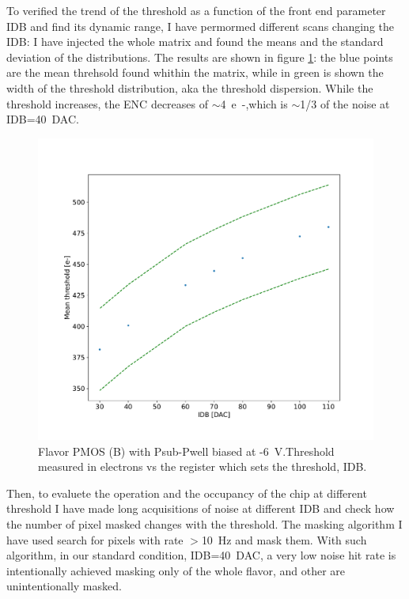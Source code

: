 
        To verified the trend of the threshold as a function of the front end parameter IDB and find its dynamic range, I have permormed different scans changing the IDB: I have injected the whole matrix and found the means and the standard deviation of the distributions. The results are shown in figure \ref{fig:threshold_vs_IDB}: the blue points are the mean threhsold found whithin the matrix, while in green is shown the width of the threshold distribution, aka the threshold dispersion. 
        While the threshold increases, the ENC decreases of $\sim$\SI{4}{e-},which is $\sim$1/3 of the noise at IDB=\SI{40}{DAC}. 
        \begin{figure}[h!]
            \centering
            \includegraphics[width=.70\linewidth]{figures/charaterization/thr_vs_IDB.pdf}
            \caption{Flavor PMOS (B) with Psub-Pwell biased at -\SI{6}{V}.Threshold measured in electrons vs the register which sets the threshold, IDB.  }
            \label{fig:threshold_vs_IDB}
        \end{figure}            

        Then, to evaluete the operation and the occupancy of the chip at different threshold I have made long acquisitions of noise at different IDB and check how the number of pixel masked changes with the threshold. The masking algorithm I have used search for pixels with rate $>$\SI{10}{Hz} and mask them. With such algorithm, in our standard condition, IDB=\SI{40}{DAC}, a very low noise hit rate is intentionally achieved masking only  of the whole flavor, and other  are unintentionally masked. 

